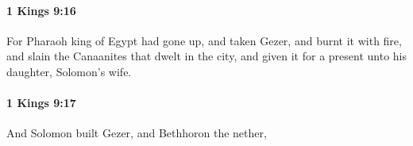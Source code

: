 		\paragraph{1 Kings 9:16} %
			\label{1KINGS-9-16}

			For Pharaoh king of Egypt had gone up, and taken Gezer, and burnt it with fire, and slain the Canaanites that dwelt in the city, and given it for a present unto his daughter, Solomon’s wife.


		\paragraph{1 Kings 9:17} %
			\label{1KINGS-9-17}

			And Solomon built Gezer, and Bethhoron the nether,


